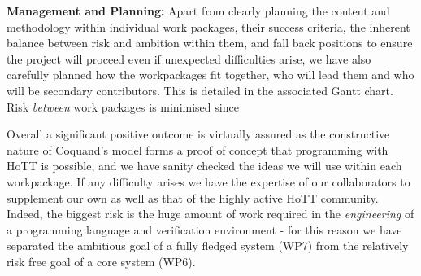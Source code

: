\documentclass[a4paper,11pt]{article}
\begin{document}
{\bf Management and Planning:} Apart from clearly planning the content
and methodology within individual work packages, their success
criteria, the inherent balance between risk and ambition within them,
and fall back positions to ensure the project will proceed even if
unexpected difficulties arise, we have also carefully planned how the
workpackages fit together, who will lead them and who will be secondary
contributors. This is detailed in the associated Gantt chart.
Risk {\em between} work packages is minimised since

Overall a significant positive outcome is virtually assured as the
constructive nature of Coquand's model forms a proof of concept that
programming with HoTT is possible, and we have sanity checked the
ideas we will use within each workpackage. If any difficulty arises we
have the expertise of our collaborators to supplement our own as well
as that of the highly active HoTT community. Indeed, the biggest risk
is the huge amount of work required in the {\em engineering} of a
programming language and verification environment - for this reason we
have separated the ambitious goal of a fully fledged system (WP7) from
the relatively risk free goal of a core system (WP6).
\end{document}
